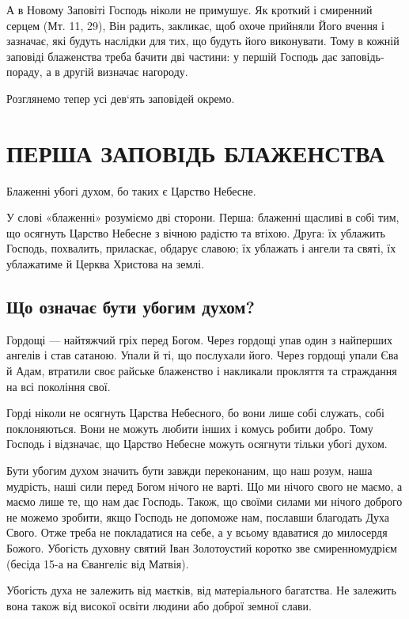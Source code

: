 \documentclass[main.tex]{subfiles}
\begin{document}
А в Новому Заповіті Господь ніколи не примушує. Як кроткий і смиренний серцем (Мт. 11, 29), Він радить, закликає, щоб охоче прийняли Його вчення і зазначає, які будуть наслідки для тих, що будуть його виконувати. Тому в кожній заповіді блаженства треба бачити дві частини: у першій Господь дає заповідь-пораду, а в другій визначає нагороду.

Розглянемо тепер усі дев`ять заповідей окремо.

\section{ПЕРША ЗАПОВІДЬ БЛАЖЕНСТВА}

Блаженні убогі духом, бо таких є Царство Небесне.

У слові «блаженні» розуміємо дві сторони. Перша: блаженні щасливі в собі тим, що осягнуть Царство Небесне з вічною радістю та втіхою. Друга: їх ублажить Господь, похвалить, приласкає, обдарує славою; їх ублажать і ангели та святі, їх ублажатиме й Церква Христова на землі.

\subsection{Що означає бути убогим духом?}

Гордощі — найтяжчий гріх перед Богом. Через гордощі упав один з найперших ангелів і став сатаною. Упали й ті, що послухали його. Через гордощі упали Єва й Адам, втратили своє райське блаженство і накликали прокляття та страждання на всі покоління свої.

Горді ніколи не осягнуть Царства Небесного, бо вони лише собі служать, собі поклоняються. Вони не можуть любити інших і комусь робити добро. Тому Господь і відзначає, що Царство Небесне можуть осягнути тільки убогі духом.

Бути убогим духом значить бути завжди переконаним, що наш розум, наша мудрість, наші сили перед Богом нічого не варті. Що ми нічого свого не маємо, а маємо лише те, що нам дає Господь. Також, що своїми силами ми нічого доброго не можемо зробити, якщо Господь не допоможе нам, пославши благодать Духа Свого. Отже треба не покладатися на себе, а у всьому вдаватися до милосердя Божого. Убогість духовну святий Іван Золотоустий коротко зве смиренномудрієм (бесіда 15-а на Євангеліє від Матвія).

Убогість духа не залежить від маєтків, від матеріального багатства. Не залежить вона також від високої освіти людини або доброї земної слави.
\end{document}
